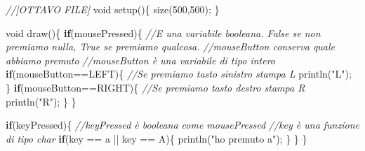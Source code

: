 \documentclass[
]{article}
\newenvironment{Shaded}{}{}
\newcommand{\CharTok}[1]{\textcolor[rgb]{0.25,0.44,0.63}{#1}}
\newcommand{\CommentTok}[1]{\textcolor[rgb]{0.38,0.63,0.69}{\textit{#1}}}
\newcommand{\ControlFlowTok}[1]{\textcolor[rgb]{0.00,0.44,0.13}{\textbf{#1}}}
\newcommand{\DataTypeTok}[1]{\textcolor[rgb]{0.56,0.13,0.00}{#1}}
\newcommand{\DecValTok}[1]{\textcolor[rgb]{0.25,0.63,0.44}{#1}}
\newcommand{\FunctionTok}[1]{\textcolor[rgb]{0.02,0.16,0.49}{#1}}
\newcommand{\NormalTok}[1]{#1}
\newcommand{\OperatorTok}[1]{\textcolor[rgb]{0.40,0.40,0.40}{#1}}
\newcommand{\StringTok}[1]{\textcolor[rgb]{0.25,0.44,0.63}{#1}}
\begin{document}
\begin{Shaded}
\begin{Highlighting}[]
\CommentTok{//[OTTAVO FILE]}
\DataTypeTok{void} \FunctionTok{setup}\OperatorTok{()\{}
  \FunctionTok{size}\OperatorTok{(}\DecValTok{500}\OperatorTok{,}\DecValTok{500}\OperatorTok{);}
\OperatorTok{\}}

\DataTypeTok{void} \FunctionTok{draw}\OperatorTok{()\{}
  \ControlFlowTok{if}\OperatorTok{(}\NormalTok{mousePressed}\OperatorTok{)\{} \CommentTok{//E\textquotesingle{} una variabile booleana. False se non premiamo nulla, True se premiamo qualcosa.}
    \CommentTok{//mouseButton conserva quale abbiamo premuto}
    \CommentTok{//mouseButton è una variabile di tipo intero}
    \ControlFlowTok{if}\OperatorTok{(}\NormalTok{mouseButton}\OperatorTok{==}\NormalTok{LEFT}\OperatorTok{)\{} \CommentTok{//Se premiamo tasto sinistro stampa L}
      \FunctionTok{println}\OperatorTok{(}\StringTok{"L"}\OperatorTok{);}
  \OperatorTok{\}}
    \ControlFlowTok{if}\OperatorTok{(}\NormalTok{mouseButton}\OperatorTok{==}\NormalTok{RIGHT}\OperatorTok{)\{} \CommentTok{//Se premiamo tasto destro stampa R}
      \FunctionTok{println}\OperatorTok{(}\StringTok{"R"}\OperatorTok{);}
    \OperatorTok{\}}
  \OperatorTok{\}}

  \ControlFlowTok{if}\OperatorTok{(}\NormalTok{keyPressed}\OperatorTok{)\{} \CommentTok{//keyPressed è booleana come mousePressed}
  \CommentTok{//key è una funzione di tipo char}
    \ControlFlowTok{if}\OperatorTok{(}\NormalTok{key }\OperatorTok{==} \CharTok{\textquotesingle{}a\textquotesingle{}} \OperatorTok{||}\NormalTok{ key }\OperatorTok{==} \CharTok{\textquotesingle{}A\textquotesingle{}}\OperatorTok{)\{}
      \FunctionTok{println}\OperatorTok{(}\StringTok{"ho premuto \textquotesingle{}a\textquotesingle{}"}\OperatorTok{);}
    \OperatorTok{\}}
  \OperatorTok{\}}
\OperatorTok{\}}
\end{Highlighting}
\end{Shaded}
\end{document}
